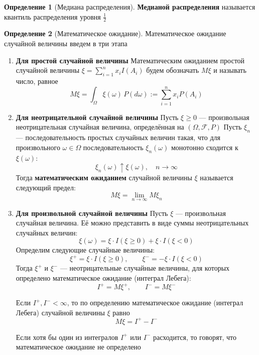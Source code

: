 \documentclass[12pt,a4paper]{article}
\theoremstyle{definition}
\newtheorem{definition}{Определение}[section]
\begin{document}
\begin{definition}[Медиана распределения]
\textbf{Медианой распределения} называется квантиль распределения уровня $\frac{1}{2}$
\end{definition}

\begin{definition}[Математическое ожидание]
    Математическое ожидание случайной величины введем в три этапа
    \begin{enumerate}[label=\arabic*.]
        \item \textbf{Для простой случайной величины}
        Математическим ожиданием простой случайной величины $\xi = \sum_{i=1}^{n} x_i I(A_i)$ будем обозначать $M\xi$ и называть число, равное
        \[
        M\xi = \int_{\Omega} \xi(\omega) \, P(d\omega) := \sum_{i=1}^{n} x_i P(A_i)
        \]
        
        \item \textbf{Для неотрицательной случайной величины}
        Пусть $\xi \ge 0$ — произвольная неотрицательная случайная величина, определённая на $(\Omega, \mathcal{F}, P)$
        Пусть $\xi_n$ — последовательность простых случайных величин такая, что для произвольного $\omega \in \Omega$ последовательность $\xi_n(\omega)$ монотонно сходится к $\xi(\omega)$:
        \[
        \xi_n(\omega) \uparrow \xi(\omega), \quad n \to \infty
        \]
        Тогда \textbf{математическим ожиданием} случайной величины $\xi$ называется следующий предел:
        \[
        M\xi = \lim_{n \to \infty} M\xi_n
        \]
        
        \item \textbf{Для произвольной случайной величины}
        Пусть $\xi$ — произвольная случайная величина. Её можно представить в виде суммы неотрицательных случайных величин:
        \[
        \xi(\omega) = \xi \cdot I(\xi \ge 0) + \xi \cdot I(\xi < 0)
        \]
        Определим следующие случайные величины:
        \[
        \xi^+ = \xi \cdot I(\xi \ge 0), \qquad \xi^- = -\xi \cdot I(\xi < 0)
        \]
        Тогда $\xi^+$ и $\xi^-$ — неотрицательные случайные величины, для которых определено математическое ожидание (интеграл Лебега):
        \[
        I^+ = M\xi^+, \qquad I^- = M\xi^-
        \]
        
        Если $I^+, I^- < \infty$, то по определению математическое ожидание (интеграл Лебега) случайной величины $\xi$ равно
        \[
        M\xi = I^+ - I^-
        \]
        
        Если хотя бы один из интегралов $I^+$ или $I^-$ расходится, то говорят, что математическое ожидание не определено
    \end{enumerate}
\end{definition}
\end{document}
